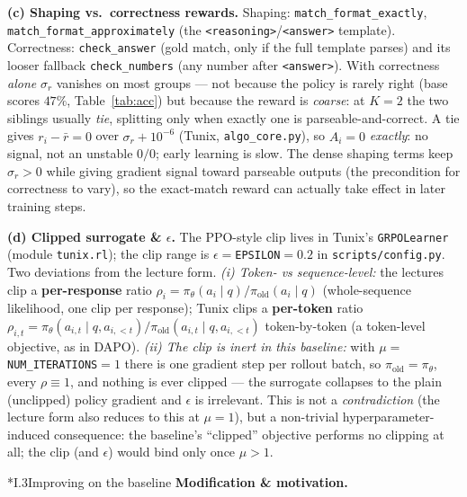 \documentclass[11pt]{article}
\makeatletter
\newcommand{\code}[1]{\texttt{#1}}
\let\origsec\section
\renewcommand{\section}{\@ifstar{\tx@sec}{\origsec}}
\newcommand{\tx@sec}[1]{\phantomsection\origsec*{#1}\addcontentsline{toc}{subsection}{#1}}
\makeatother
\begin{document}
\textbf{(c) Shaping vs.\ correctness rewards.} Shaping: \code{match\_format\_exactly}, \code{match\_format\_approximately} (the
\code{<reasoning>}/\code{<answer>} template). Correctness: \code{check\_answer} (gold match, only if the full template parses) and its looser fallback \code{check\_numbers} (any number
after \code{<answer>}). With correctness \emph{alone} $\sigma_r$ vanishes on most groups --- not because the policy is rarely right (base scores $47\%$,
Table~\ref{tab:acc}) but because the reward is \emph{coarse}: at $K{=}2$ the two siblings usually \emph{tie}, splitting only when exactly one is
parseable-and-correct. A tie gives $r_i{-}\bar r{=}0$ over $\sigma_r{+}10^{-6}$ (Tunix, \code{algo\_core.py}), so $\hat A_i{=}0$ \emph{exactly}: no signal,
not an unstable $0/0$; early learning is slow. The dense shaping
terms keep $\sigma_r{>}0$ while giving gradient signal toward parseable outputs (the precondition for correctness to vary), so the exact-match
reward can actually take effect in later training steps.

\textbf{(d) Clipped surrogate \& $\epsilon$.} The PPO-style clip lives in Tunix's \code{GRPOLearner} (module \code{tunix.rl}); the clip range is
$\epsilon{=}$\code{EPSILON}$=0.2$ in \code{scripts/config.py}. Two deviations from the lecture form. \emph{(i) Token- vs sequence-level:} the
lectures clip a \textbf{per-response} ratio $\rho_i{=}\pi_\theta(a_i\mid q)/\pi_{\mathrm{old}}(a_i\mid q)$ (whole-sequence likelihood, one clip
per response); Tunix clips a \textbf{per-token} ratio $\rho_{i,t}{=}\pi_\theta(a_{i,t}\mid q,a_{i,<t})/\pi_{\mathrm{old}}(a_{i,t}\mid q,a_{i,<t})$
token-by-token (a token-level objective, as in DAPO). \emph{(ii) The clip is inert in this baseline:} with $\mu{=}$\code{NUM\_ITERATIONS}$=1$
there is one gradient step per rollout batch, so $\pi_{\mathrm{old}}{=}\pi_\theta$, every $\rho\equiv1$, and nothing is ever clipped --- the
surrogate collapses to the plain (unclipped) policy gradient and $\epsilon$ is irrelevant. This is not a \emph{contradiction} (the lecture form
also reduces to this at $\mu{=}1$), but a non-trivial hyperparameter-induced consequence: the baseline's ``clipped'' objective performs no
clipping at all; the clip (and $\epsilon$) would bind only once $\mu>1$.

\section*{I.3\quad Improving on the baseline}
\textbf{Modification \& motivation.}
\end{document}
